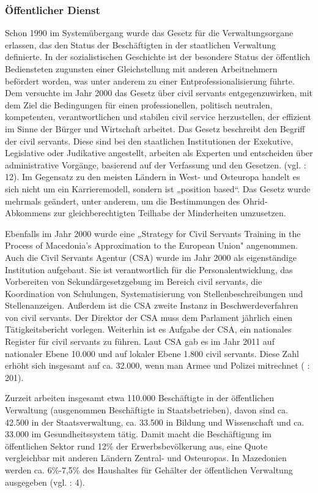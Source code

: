 \subsubsection{Öffentlicher Dienst}
Schon 1990 im Systemübergang wurde das Gesetz für die Verwaltungsorgane erlassen, das den Status der Beschäftigten in der staatlichen Verwaltung definierte. In der sozialistischen Geschichte ist der besondere Status der öffentlich Bediensteten zugunsten einer Gleichstellung mit anderen Arbeitnehmern befördert worden, was unter anderem zu einer Entprofessionalisierung führte. Dem versuchte im Jahr 2000 das Gesetz über civil servants entgegenzuwirken, mit dem Ziel die Bedingungen für einen professionellen, politisch neutralen, kompetenten, verantwortlichen und stabilen civil service herzustellen, der effizient im Sinne der Bürger und Wirtschaft arbeitet. Das Gesetz beschreibt den Begriff der civil servants. Diese sind bei den staatlichen Institutionen der Exekutive, Legislative oder Judikative angestellt, arbeiten als Experten und entscheiden über administrative Vorgänge, basierend auf der Verfassung und den Gesetzen. (vgl. \cite{markic} : 12). Im Gegensatz zu den meisten Ländern in West- und Osteuropa handelt es sich nicht um ein Karrieremodell, sondern ist „position based“. Das Gesetz wurde mehrmals geändert, unter anderem, um die Bestimmungen des Ohrid-Abkommens zur gleichberechtigten Teilhabe der Minderheiten umzusetzen. \par
Ebenfalls im Jahr 2000 wurde eine „Strategy for Civil Servants Training in the Process of Macedonia's Approximation to the European Union" angenommen. Auch die Civil Servants Agentur (CSA) wurde im Jahr 2000 als eigenständige Institution aufgebaut. Sie ist verantwortlich für die Personalentwicklung, das Vorbereiten von Sekundärgesetzgebung im Bereich civil servants, die Koordination von Schulungen, Systematisierung von Stellenbeschreibungen und Stellenanzeigen. Außerdem ist die CSA zweite Instanz in Beschwerdeverfahren von civil servants. Der Direktor der CSA muss dem Parlament jährlich einen Tätigkeitsbericht vorlegen. Weiterhin ist es Aufgabe der CSA, ein nationales Register für civil servants zu führen. Laut CSA gab es im Jahr 2011 auf nationaler Ebene 10.000 und auf lokaler Ebene 1.800 civil servants. Diese Zahl erhöht sich insgesamt auf ca. 32.000, wenn man Armee und Polizei mitrechnet (\cite{repofmac04} : 201). \par
Zurzeit arbeiten insgesamt etwa 110.000 Beschäftigte in der öffentlichen Verwaltung (ausgenommen Beschäftigte in Staatsbetrieben), davon sind ca. 42.500 in der Staatsverwaltung, ca. 33.500 in Bildung und Wissenschaft und ca. 33.000 im Gesundheitssystem tätig. Damit macht die Beschäftigung im öffentlichen Sektor rund 12\% der Erwerbsbevölkerung aus, eine Quote vergleichbar mit anderen Ländern Zentral- und Osteuropas. In Mazedonien werden ca. 6\%-7,5\% des Haushaltes für Gehälter der öffentlichen Verwaltung ausgegeben (vgl. \cite{analyt09} : 4).\par
